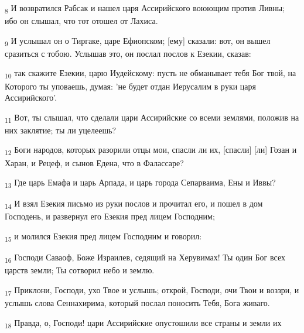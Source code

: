 \begin{tcolorbox}
\textsubscript{8} И возвратился Рабсак и нашел царя Ассирийского воюющим против Ливны; ибо он слышал, что тот отошел от Лахиса.
\end{tcolorbox}
\begin{tcolorbox}
\textsubscript{9} И услышал он о Тиргаке, царе Ефиопском; [ему] сказали: вот, он вышел сразиться с тобою. Услышав это, он послал послов к Езекии, сказав:
\end{tcolorbox}
\begin{tcolorbox}
\textsubscript{10} так скажите Езекии, царю Иудейскому: пусть не обманывает тебя Бог твой, на Которого ты уповаешь, думая: 'не будет отдан Иерусалим в руки царя Ассирийского'.
\end{tcolorbox}
\begin{tcolorbox}
\textsubscript{11} Вот, ты слышал, что сделали цари Ассирийские со всеми землями, положив на них заклятие; ты ли уцелеешь?
\end{tcolorbox}
\begin{tcolorbox}
\textsubscript{12} Боги народов, которых разорили отцы мои, спасли ли их, [спасли] [ли] Гозан и Харан, и Рецеф, и сынов Едена, что в Фалассаре?
\end{tcolorbox}
\begin{tcolorbox}
\textsubscript{13} Где царь Емафа и царь Арпада, и царь города Сепарваима, Ены и Иввы?
\end{tcolorbox}
\begin{tcolorbox}
\textsubscript{14} И взял Езекия письмо из руки послов и прочитал его, и пошел в дом Господень, и развернул его Езекия пред лицем Господним;
\end{tcolorbox}
\begin{tcolorbox}
\textsubscript{15} и молился Езекия пред лицем Господним и говорил:
\end{tcolorbox}
\begin{tcolorbox}
\textsubscript{16} Господи Саваоф, Боже Израилев, седящий на Херувимах! Ты один Бог всех царств земли; Ты сотворил небо и землю.
\end{tcolorbox}
\begin{tcolorbox}
\textsubscript{17} Приклони, Господи, ухо Твое и услышь; открой, Господи, очи Твои и воззри, и услышь слова Сеннахирима, который послал поносить Тебя, Бога живаго.
\end{tcolorbox}
\begin{tcolorbox}
\textsubscript{18} Правда, о, Господи! цари Ассирийские опустошили все страны и земли их
\end{tcolorbox}
